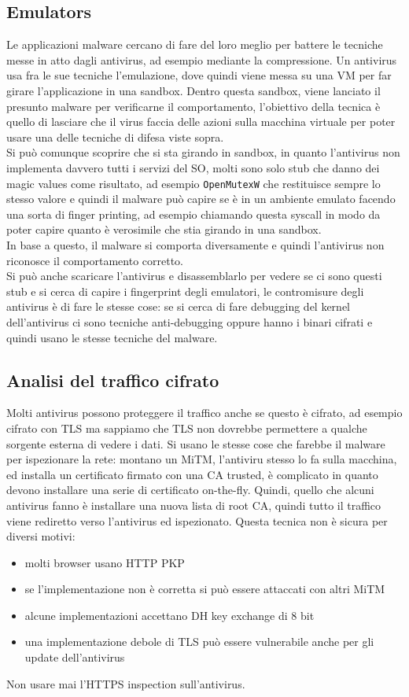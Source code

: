 \documentclass[12pt, oneside]{extbook} %
\begin{document}
\subsection{Emulators}
Le applicazioni malware cercano di fare del loro meglio per battere le tecniche messe in atto dagli antivirus, ad esempio mediante la compressione. Un antivirus usa fra le sue tecniche l'emulazione, dove quindi viene messa su una VM per far girare l'applicazione in una sandbox. Dentro questa sandbox, viene lanciato il presunto malware per verificarne il comportamento, l'obiettivo della tecnica è quello di lasciare che il virus faccia delle azioni sulla macchina virtuale per poter usare una delle tecniche di difesa viste sopra.\\Si può comunque scoprire che si sta girando in sandbox, in quanto l'antivirus non implementa davvero tutti i servizi del SO, molti sono solo stub che danno dei magic values come risultato, ad esempio \texttt{OpenMutexW} che restituisce sempre lo stesso valore e quindi il malware può capire se è in un ambiente emulato facendo una sorta di finger printing, ad esempio chiamando questa syscall in modo da poter capire quanto è verosimile che stia girando in una sandbox.\\In base a questo, il malware si comporta diversamente e quindi l'antivirus non riconosce il comportamento corretto.\\Si può anche scaricare l'antivirus e disassemblarlo per vedere se ci sono questi stub e si cerca di capire i fingerprint degli emulatori, le contromisure degli antivirus è di fare le stesse cose: se si cerca di fare debugging del kernel dell'antivirus ci sono tecniche anti-debugging oppure hanno i binari cifrati e quindi usano le stesse tecniche del malware.

\subsection{Analisi del traffico cifrato}
Molti antivirus possono proteggere il traffico anche se questo è cifrato, ad esempio cifrato con TLS ma sappiamo che TLS non dovrebbe permettere a qualche sorgente esterna di vedere i dati. Si usano le stesse cose che farebbe il malware per ispezionare la rete: montano un MiTM, l'antiviru stesso lo fa sulla macchina, ed installa un certificato firmato con una CA trusted, è complicato in quanto devono installare una serie di certificato on-the-fly. Quindi, quello che alcuni antivirus fanno è installare una nuova lista di root CA, quindi tutto il traffico viene rediretto verso l'antivirus ed ispezionato. Questa tecnica non è sicura per diversi motivi:
\begin{itemize}
	\item molti browser usano HTTP PKP
	\item se l'implementazione non è corretta si può essere attaccati con altri MiTM
	\item alcune implementazioni accettano DH key exchange di 8 bit
	\item una implementazione debole di TLS può essere vulnerabile anche per gli update dell'antivirus
\end{itemize}
Non usare mai l'HTTPS inspection sull'antivirus.
\end{document}
